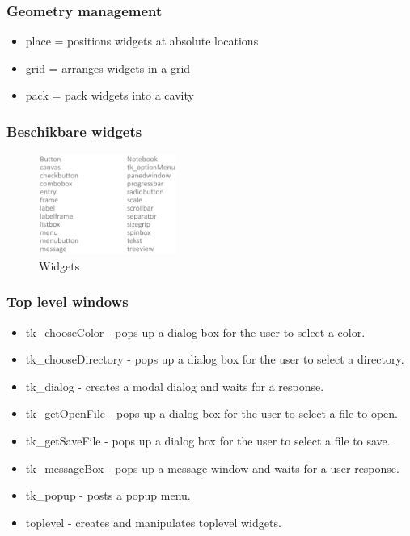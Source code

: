 \documentclass{article}
\begin{document}
\subsubsection{Geometry management}

\begin{itemize}
    \item place = positions widgets at absolute locations
    \item grid = arranges widgets in a grid
    \item pack = pack widgets into a cavity
\end{itemize}

\subsubsection{Beschikbare widgets}

\begin{figure}[H]
    \centering
    \includegraphics[width=0.4\textwidth]{tkinter-widgets.png}
    \caption{Widgets}
\end{figure}

\subsubsection{Top level windows}

\begin{itemize}
    \item tk\_chooseColor - pops up a dialog box for the user to select a color.
    \item tk\_chooseDirectory - pops up a dialog box for the user to select a directory.
    \item tk\_dialog - creates a modal dialog and waits for a response.
    \item tk\_getOpenFile - pops up a dialog box for the user to select a file to open.
    \item tk\_getSaveFile - pops up a dialog box for the user to select a file to save.
    \item tk\_messageBox - pops up a message window and waits for a user response.
    \item tk\_popup - posts a popup menu.
    \item toplevel - creates and manipulates toplevel widgets.
\end{itemize}
\end{document}
